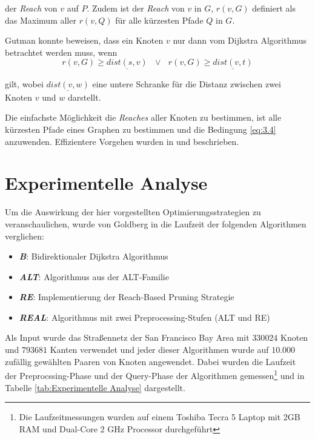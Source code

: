der \textit{Reach} von $v$ auf $P$. Zudem ist der \textit{Reach} von $v$ in $G$, $r(v,G)$ definiert als das Maximum aller $r(v,Q)$ für alle kürzesten Pfade $Q$ in $G$. 

Gutman konnte beweisen, dass ein Knoten $v$ nur dann vom Dijkstra Algorithmus betrachtet werden muss, wenn 
\begin{equation} \label{eq:3.4}
	r(v,G) \ge \underline{dist(s,v)} \: \: \: \vee \: \: \: r(v,G) \ge \underline{dist(v,t)}
\end{equation}

gilt, wobei $\underline{dist(v,w)}$ eine untere Schranke für die Distanz zwischen zwei Knoten $v$ und $w$ darstellt. 

Die einfachste Möglichkeit die \textit{Reaches} aller Knoten zu bestimmen, ist alle kürzesten Pfade eines Graphen zu bestimmen und die Bedingung \ref{eq:3.4}  anzuwenden. Effizientere Vorgehen wurden in \cite{Goldberg2007} und \cite{Gutman2004} beschrieben.

\newpage
\section{Experimentelle Analyse}
Um die Auswirkung der hier vorgestellten Optimierungsstrategien zu veranschaulichen, wurde von Goldberg in \cite{Goldberg2007} die Laufzeit der folgenden Algorithmen verglichen:
\begin{itemize}
	\item \textit{\textbf{B}}: Bidirektionaler Dijkstra Algorithmus 
	\item \textit{\textbf{ALT}}: Algorithmus aus der ALT-Familie 
	\item \textit{\textbf{RE}}: Implementierung der Reach-Based Pruning Strategie 
	\item \textit{\textbf{REAL}}: Algorithmus mit zwei Preprocessing-Stufen (ALT und RE)
\end{itemize}
Als Input wurde das Straßennetz der San Francisco Bay Area mit $330 024$ Knoten und $793 681$ Kanten verwendet und jeder dieser Algorithmen wurde auf $10.000$ zufällig gewählten Paaren von Knoten angewendet. Dabei wurden die Laufzeit der Preprocssing-Phase und der Query-Phase der Algorithmen gemessen\footnote{Die Laufzeitmessungen wurden auf einem Toshiba Tecra 5 Laptop mit 2GB RAM und Dual-Core 2 GHz Processor durchgeführt} und in Tabelle \ref{tab:Experimentelle Analyse} dargestellt.

